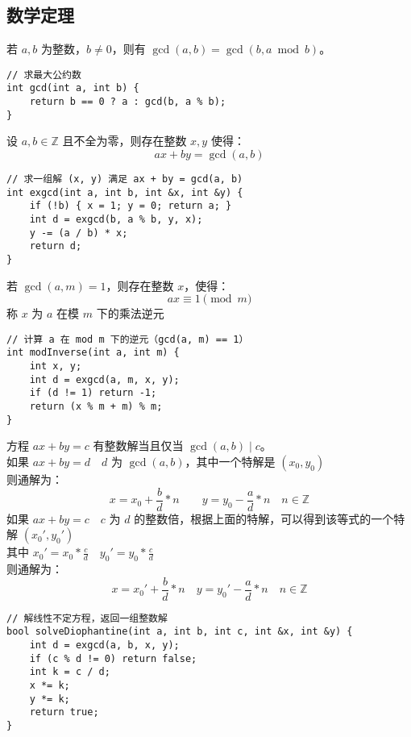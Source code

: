 \subsection{数学定理}

\begin{theorem}[欧几里得]
若 $a, b$ 为整数，$b \ne 0$，则有 $\gcd(a, b) = \gcd(b, a \bmod b)$。
\end{theorem}
\begin{lstlisting}
// 求最大公约数
int gcd(int a, int b) {
    return b == 0 ? a : gcd(b, a % b);
}
\end{lstlisting}

\begin{theorem}[扩展欧几里得]
设 $a, b \in \mathbb{Z}$ 且不全为零，则存在整数 $x, y$ 使得：
\[
ax + by = \gcd(a, b)
\]
\end{theorem}
\begin{lstlisting}
// 求一组解 (x, y) 满足 ax + by = gcd(a, b)
int exgcd(int a, int b, int &x, int &y) {
    if (!b) { x = 1; y = 0; return a; }
    int d = exgcd(b, a % b, y, x);
    y -= (a / b) * x;
    return d;
}
\end{lstlisting}


\begin{theorem}[模逆元]
若 $\gcd(a, m) = 1$，则存在整数 $x$，使得：
\[
ax \equiv 1 \pmod{m}
\]
称 $x$ 为 $a$ 在模 $m$ 下的乘法逆元
\end{theorem}
\begin{lstlisting}
// 计算 a 在 mod m 下的逆元（gcd(a, m) == 1）
int modInverse(int a, int m) {
    int x, y;
    int d = exgcd(a, m, x, y);
    if (d != 1) return -1;
    return (x % m + m) % m;
}
\end{lstlisting}

\begin{theorem}[线性不定方程求解]
方程 $ax + by = c$ 有整数解当且仅当 $\gcd(a, b) \mid c$。 \\
如果 $ax + by = d \quad d$ 为 $\gcd(a, b)$，其中一个特解是 $(x_0, y_0)$ \\
则通解为：
\[
x = x_0 + \frac{b}{d} \ast n \qquad y = y_0 - \frac{a}{d} \ast n \quad n \in \mathbb{Z}
\]
如果 $ax + by = c \quad c$ 为 $d$ 的整数倍，根据上面的特解，可以得到该等式的一个特解 $(x_0', y_0')$ \\
其中 $x_0' = x_0 \ast \frac{c}{d} \quad y_0' = y_0 \ast \frac{c}{d}$ \\
则通解为：
\[
x = x_0' + \frac{b}{d} \ast n \quad y = y_0' - \frac{a}{d} \ast n \quad n \in \mathbb{Z}
\]
\end{theorem}
\begin{lstlisting}
// 解线性不定方程，返回一组整数解
bool solveDiophantine(int a, int b, int c, int &x, int &y) {
    int d = exgcd(a, b, x, y);
    if (c % d != 0) return false;
    int k = c / d;
    x *= k;
    y *= k;
    return true;
}
\end{lstlisting}

